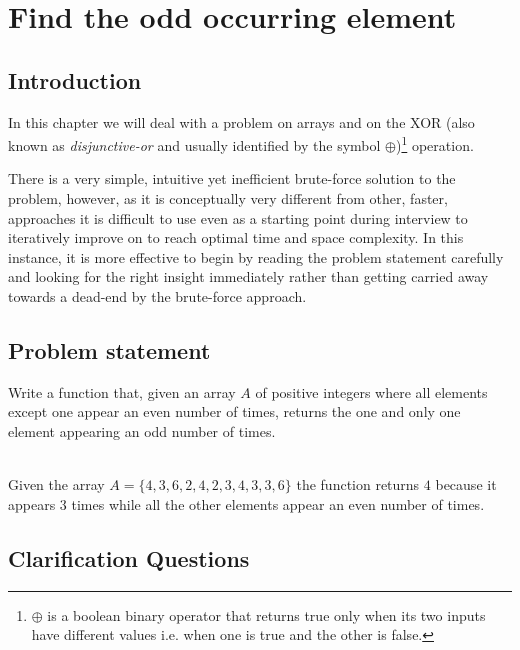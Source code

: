 %

\chapter{Find the odd occurring element}
\label{ch:find_odd_occurring_element}
\section*{Introduction}

In this chapter we will deal with  a problem on arrays and on the XOR (also known as \textit{disjunctive-or} and usually identified by the symbol
$\oplus$)\footnote{
	$\oplus$ is a boolean binary operator that returns true only when its two inputs have different values i.e. when one is true and the other is false.} 
operation.

There is a very simple, intuitive yet inefficient brute-force solution to the problem, however, as it is conceptually very different from other, faster, approaches it is difficult to use even as a starting point during interview to iteratively improve on to reach optimal time and space complexity.  In this instance, it is more effective to begin by reading the problem statement carefully and looking for the right insight immediately rather than getting carried away towards a dead-end by the brute-force approach.

\section{Problem statement}
\begin{exercise}
Write a function that, given an array $A$ of positive integers where all elements except one appear an even number of times, returns the one and only one element appearing an odd number of times.

	\begin{example}
		\label{ex:find_odd_occurring_element:example1}
		\hfill \\
		Given the array $A=\{4,3,6,2,4,2,3,4,3,3,6\}$ the function returns $4$ because it appears $3$ times while all the other elements appear an even number of times.
		
	\end{example}
\end{exercise}


\section{Clarification Questions}

